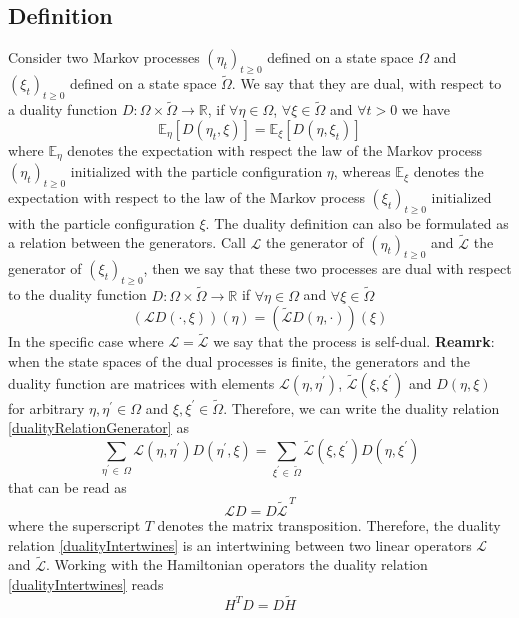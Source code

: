 \documentclass[11pt]{article}
\numberwithin{equation}{section}
\numberwithin{equation}{subsection}
\begin{document}
\subsection{Definition}
Consider two Markov processes $(\eta_{t})_{t\geq 0}$ defined on a state space $\Omega$ and $(\xi_{t})_{t\geq 0}$ defined on a state space $\widetilde{\Omega}$. We say that they are dual, with respect to a duality function $D:\Omega\times \widetilde{\Omega}\to \mathbb{R}$, if $\forall \eta\in\Omega$, $\forall \xi\in\widetilde{\Omega}$ and $\forall t> 0$ we have 
\begin{equation}
    \mathbb{E}_{\eta}\left[D(\eta_{t},\xi)\right]=\mathbb{E}_{\xi}\left[D(\eta,\xi_{t})\right]
\end{equation}
where $\mathbb{E}_{\eta}$ denotes the expectation with respect the law of the Markov process $(\eta_{t})_{t\geq 0}$ initialized with the particle configuration $\eta$, whereas $\mathbb{E}_{\xi}$ denotes the expectation with respect to the law of the Markov process $(\xi_{t})_{t\geq 0}$ initialized with the particle configuration $\xi$.
The duality definition can also be formulated as a relation between the generators. Call $\mathcal{L}$ the generator of $(\eta_{t})_{t\geq0}$ and $\widetilde{\mathcal{L}}$ the generator of $(\xi_{t})_{t\geq 0}$, then we say that these two processes are dual with respect to the duality function $D:\Omega\times \widetilde{\Omega}\to \mathbb{R}$ if $\forall \eta\in\Omega$ and $\forall \xi\in\widetilde{\Omega}$
\begin{equation}\label{dualityRelationGenerator}
    \left(\mathcal{L}D(\cdot,\xi)\right)(\eta)=\left(\widetilde{\mathcal{L}}D(\eta,\cdot)\right)(\xi)
\end{equation}
In the specific case where $\mathcal{L}=\widetilde{\mathcal{L}}$ we say that the process is self-dual.
\newline
\newline
\textbf{Reamrk}:
when the state spaces of the dual processes is finite, the generators and the duality function are matrices with elements $\mathcal{L}(\eta,\eta^{'})$, $\widetilde{\mathcal{L}}(\xi,\xi^{'})$ and $D(\eta,\xi)$ for arbitrary $\eta,\eta^{'}\in\Omega$ and $\xi,\xi^{'}\in \widetilde{\Omega}$. Therefore, we can write the duality relation \eqref{dualityRelationGenerator} as 
\begin{equation}
    \sum_{\eta^{'}\in\,\Omega}\mathcal{L}(\eta,\eta^{'})D(\eta^{'},\xi)=\sum_{\xi^{'}\in\, \widetilde{\Omega}}\widetilde{\mathcal{L}}(\xi,\xi^{'})D(\eta,\xi^{'})
\end{equation}
that can be read as
\begin{equation}\label{dualityIntertwines}
    \mathcal{L}D=D\widetilde{\mathcal{L}}^{\,T}
\end{equation}
where the superscript $T$ denotes the matrix transposition. Therefore, the duality relation \eqref{dualityIntertwines} is an intertwining between two linear operators $\mathcal{L}$ and $\widetilde{\mathcal{L}}$. Working with the Hamiltonian operators the duality relation \eqref{dualityIntertwines} reads 
\begin{equation}\label{DualityRelation}
    H^{T}D=D\widetilde{H}
\end{equation}
\end{document}
